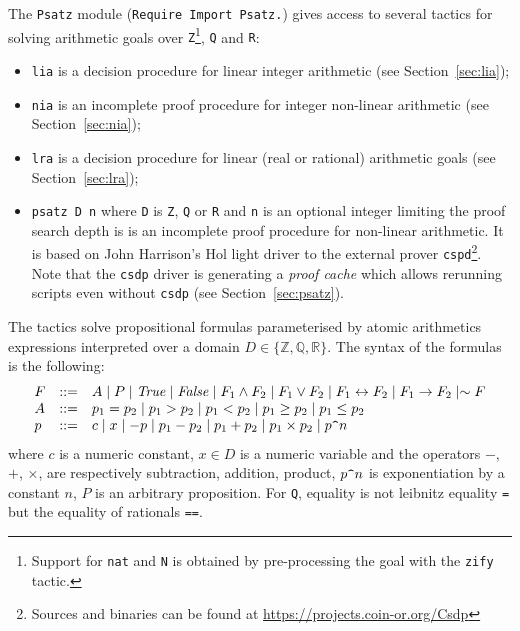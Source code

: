 \newtheorem{theorem}{Theorem}

 
   
\label{sec:psatz-hurry}
The {\tt Psatz} module ({\tt Require Import Psatz.}) gives access to several tactics for solving arithmetic goals over
 {\tt Z}\footnote{Support for {\tt nat} and {\tt N} is obtained by pre-processing the goal with the {\tt zify} tactic.}, {\tt Q} and {\tt R}:
\begin{itemize}
\item {\tt lia} is a decision procedure for linear integer arithmetic (see Section~\ref{sec:lia});
\item {\tt nia} is an incomplete proof procedure for integer non-linear arithmetic (see Section~\ref{sec:nia});
\item {\tt lra} is a decision procedure for linear (real or rational) arithmetic goals (see Section~\ref{sec:lra});
\item {\tt psatz D n} where {\tt D} is {\tt Z}, {\tt Q} or {\tt R} and {\tt n} is an optional integer limiting the proof search depth is
is an incomplete proof procedure for non-linear arithmetic. It is based on John Harrison's Hol light driver to the external prover {\tt cspd}\footnote{Sources and binaries can be found at \url{https://projects.coin-or.org/Csdp}}. 
   Note that the {\tt csdp} driver is generating 
   a \emph{proof cache} which allows rerunning scripts even without {\tt csdp} (see Section~\ref{sec:psatz}).
\end{itemize}

The tactics solve propositional formulas parameterised by atomic arithmetics expressions
interpreted over a domain $D \in \{\mathbb{Z}, \mathbb{Q}, \mathbb{R} \}$.
The syntax of the formulas is the following:
\[
\begin{array}{lcl}
 F &::=&  A \mid P \mid \mathit{True} \mid \mathit{False} \mid F_1 \land F_2 \mid F_1 \lor F_2 \mid F_1 \leftrightarrow F_2 \mid F_1 \to F_2 \mid \sim F\\
 A &::=& p_1 = p_2 \mid  p_1 > p_2 \mid p_1 < p_2 \mid p_1 \ge p_2 \mid p_1 \le p_2 \\
 p &::=& c \mid x \mid {-}p \mid p_1 - p_2 \mid p_1 + p_2 \mid p_1 \times p_2 \mid p \verb!^! n
 \end{array}
 \]
 where $c$ is a numeric constant, $x\in D$ is a numeric variable and the operators $-$, $+$, $\times$, are
 respectively subtraction, addition, product, $p \verb!^!n $ is exponentiation by a constant $n$, $P$ is an
 arbitrary proposition.
 For {\tt Q}, equality is not leibnitz equality {\tt =} but the equality of rationals {\tt ==}.

